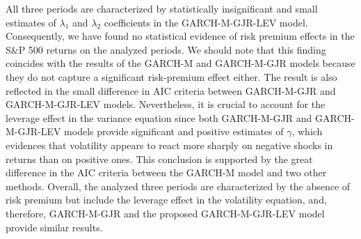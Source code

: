 \documentclass[authoryear, 1p]{elsarticle}
\numberwithin{equation}{section}
\begin{document}
All three periods are characterized by statistically insignificant and small estimates of $\lambda_{1}$ and $\lambda_{2}$ coefficients in the GARCH-M-GJR-LEV model. Consequently, we have found no statistical evidence of risk premium effects in the S\&P 500 returns on the analyzed periods. We should note that this finding coincides with the results of the GARCH-M and GARCH-M-GJR models because they do not capture a significant risk-premium effect either. The result is also reflected in the small difference in AIC criteria between GARCH-M-GJR and GARCH-M-GJR-LEV models. Nevertheless, it is crucial to account for the leverage effect in the variance equation since both GARCH-M-GJR and GARCH-M-GJR-LEV models provide significant and positive estimates of $\gamma$, which evidences that volatility appears to react more sharply on negative shocks in returns than on positive ones. This conclusion is supported by the great difference in the AIC criteria between the GARCH-M model and two other methods. Overall, the analyzed three periods are characterized by the absence of risk premium but include the leverage effect in the volatility equation, and, therefore, GARCH-M-GJR and the proposed GARCH-M-GJR-LEV model provide similar results.
\end{document}
